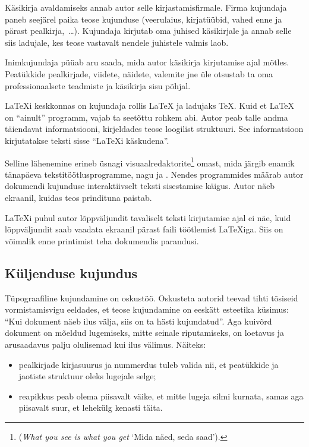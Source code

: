 Käsikirja avaldamiseks annab autor selle kirjastamisfirmale. Firma
kujundaja paneb seejärel paika teose kujunduse (veerulaius, kirjatüübid,
vahed enne ja pärast pealkirja,~\ldots). Kujundaja kirjutab oma juhised
käsikirjale ja annab selle siis ladujale, kes teose vastavalt nendele
juhistele valmis laob.

Inimkujundaja püüab aru saada, mida autor käsikirja kirjutamise ajal
mõtles. Peatükkide pealkirjade, viidete, näidete, valemite jne üle
otsustab ta oma professionaalsete teadmiste ja käsikirja sisu põhjal.

\LaTeX i keskkonnas on kujundaja rollis \LaTeX{} ja ladujaks \TeX. Kuid
et \LaTeX{} on "`ainult"' programm, vajab ta seetõttu rohkem abi. Autor
peab talle andma täiendavat informatsiooni, kirjeldades teose loogilist
struktuuri. See informatsioon kirjutatakse teksti sisse "`\LaTeX i
käskudena"'.

Selline lähenemine erineb üsnagi
visuaalredaktorite\footnote{
(\emph{What you see is what you get} `Mida näed, seda saad').} omast,
mida järgib enamik tänapäeva tekstitöötlusprogramme, nagu 
ja . Nendes programmides määrab autor dokumendi
kujunduse interaktiivselt teksti sisestamise käigus. Autor näeb
ekraanil, kuidas teos prindituna paistab.

\LaTeX i puhul autor lõppväljundit tavaliselt teksti kirjutamise ajal ei
näe, kuid lõppväljundit saab vaadata ekraanil pärast faili töötlemist
\LaTeX iga. Siis on võimalik enne printimist teha dokumendis parandusi.

\subsection{Küljenduse kujundus}

Tüpograafiline kujundamine on oskustöö. Oskusteta autorid teevad tihti
tõsiseid vormistamisvigu eeldades, et teose kujundamine on eeskätt
esteetika küsimus: "`Kui dokument näeb ilus välja, siis on ta hästi
kujundatud"'. Aga kuivõrd dokument on mõeldud lugemiseks, mitte seinale
riputamiseks, on loetavus ja arusaadavus palju olulisemad kui ilus
välimus. Näiteks:\enlargethispage{1.3\baselineskip}
\begin{itemize}
\item pealkirjade kirjasuurus ja nummerdus tuleb valida nii, et
  peatükkide ja jaotiste struktuur oleks lugejale selge;
\item reapikkus peab olema piisavalt väike, et mitte lugeja silmi
  kurnata, samas aga piisavalt suur, et lehekülg kenasti täita.
\end{itemize}

